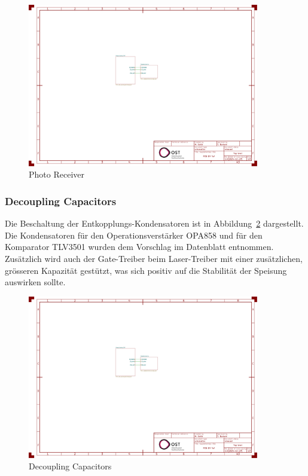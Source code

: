 \begin{figure}[H]
    \centering
    \includegraphics[page=3, trim=100 240 600 340, clip, width=0.9\textwidth]{attachments/schematic.pdf}
    \caption{Photo Receiver}\label{fig:photo_receiver}
\end{figure}

\subsubsection{Decoupling Capacitors}

Die Beschaltung der Entkopplungs-Kondensatoren ist in Abbildung~\ref{fig:decoupling_capacitors} dargestellt. Die
Kondensatoren für den Operationsverstärker OPA858 und für den Komparator TLV3501 wurden dem Vorschlag im Datenblatt
entnommen. Zusätzlich wird auch der Gate-Treiber beim Laser-Treiber mit einer zusätzlichen, grösseren Kapazität gestützt,
was sich positiv auf die Stabilität der Speisung auswirken sollte.

\begin{figure}[H]
    \centering
    \includegraphics[page=3, trim=100 60 650 630, clip, width=0.9\textwidth]{attachments/schematic.pdf}
    \caption{Decoupling Capacitors}\label{fig:decoupling_capacitors}
\end{figure}

